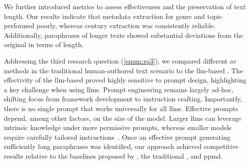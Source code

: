 We further introduced metrics to assess \pextractor{} effectiveness and the preservation of text length. 
Our results indicate that metadata extraction for genre and topic performed poorly, whereas century extraction was consistently reliable. 
Additionally, paraphrases of longer \dataGutenberg{} texts showed substantial deviations from the original in terms of length.

Addressing the third research question (\ref{enum:rq3}), we compared different \ac{av} methods in the traditional human-authored text scenario 
to the \ac{llm}-based \impAppr{}.
The effectivity of the \ac{llm}-based \impAppr{} proved highly sensitive to prompt design, highlighting a key challenge when using \acp{llm}. 
Prompt engineering remains largely ad-hoc, shifting focus from framework development to instruction crafting. 
Importantly, there is no single prompt that works universally for all \acp{llm}. 
Effective prompts depend, among other factors, on the size of the model. 
Larger \acp{llm} can leverage intrinsic knowledge under more permissive prompts, whereas smaller models require carefully tailored instructions~\citep{schmidt_llm_av_latin_24}.
Once an effective prompt generating sufficiently long paraphrases was identified, our approach achieved competitive results relative to the baselines proposed by \citet{koppel_determining_2014}, the traditional \impAppr{}, \unmasking{} and \ac{ppmd}.

